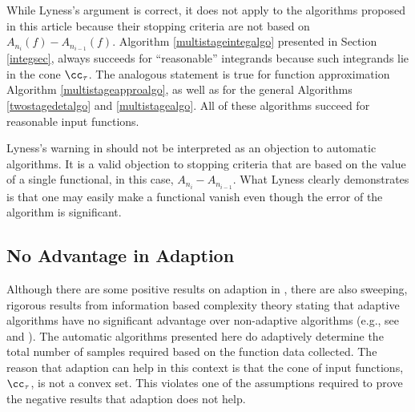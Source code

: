 \documentclass[]{elsarticle}
\theoremstyle{definition}
\theoremstyle{remark}
\begin{document}
While Lyness's argument is correct, it does not apply to the algorithms proposed in this article because their stopping criteria are not based on  $A_{n_{i}}(f)-A_{n_{i-1}}(f)$.  Algorithm \ref{multistageintegalgo} presented in Section \ref{integsec}, always succeeds for ``reasonable'' integrands because such integrands lie in the cone $\cc_{\tau}$.  The analogous statement is true for function approximation Algorithm \ref{multistageapproalgo}, as well as for the general Algorithms \ref{twostagedetalgo} and \ref{multistagealgo}.  All of these algorithms succeed for reasonable input functions.  

Lyness's warning in \cite{Lyn83} should not be interpreted as an objection to automatic algorithms.  It is a valid objection to stopping criteria that are based on the value of a single functional, in this case, $A_{n_{i}}-A_{n_{i-1}}$.  What Lyness clearly demonstrates is that one may easily make a functional vanish even though the error of the algorithm is significant.

\subsection{No Advantage in Adaption}

Although there are some positive results on adaption in \cite{Nov96a,PlaWas05a,PlaEtal08a}, there are also sweeping, rigorous results from information based complexity theory stating that adaptive algorithms have no significant advantage over non-adaptive algorithms (e.g., see \citep[Chapter 4, Theorem 5.2.1]{TraWasWoz88} and \cite{Nov96a}). The automatic algorithms presented here do adaptively determine the total number of samples required based on the function data collected.  The reason that adaption can help in this context is that the cone of input functions, $\cc_{\tau}$, is not a convex set.  This violates one of the assumptions required to prove the negative results that adaption does not help.
\end{document}
